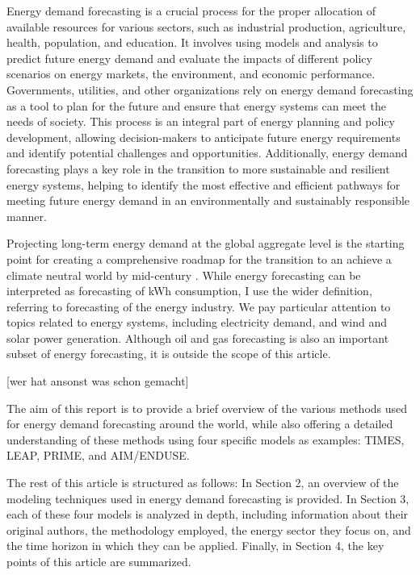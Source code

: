 \documentclass[lettersize,journal]{IEEEtran}
\begin{document}
Energy demand forecasting is a crucial process for the proper allocation of available resources for various sectors, such as industrial production, agriculture, health, population, and education. It involves using models and analysis to predict future energy demand and evaluate the impacts of different policy scenarios on energy markets, the environment, and economic performance. Governments, utilities, and other organizations rely on energy demand forecasting as a tool to plan for the future and ensure that energy systems can meet the needs of society. This process is an integral part of energy planning and policy development, allowing decision-makers to anticipate future energy requirements and identify potential challenges and opportunities. Additionally, energy demand forecasting plays a key role in the transition to more sustainable and resilient energy systems, helping to identify the most effective and efficient pathways for meeting future energy demand in an environmentally and sustainably responsible manner.

Projecting long-term energy demand at the global aggregate level is the starting point for creating a comprehensive roadmap for the transition to an achieve a climate neutral world by mid-century \cite{UNFCCC}. While energy forecasting can be interpreted as forecasting of kWh consumption, I use the wider definition, referring to forecasting of the energy industry. We pay particular attention to topics related to energy systems, including electricity demand, and wind and solar power generation. Although oil and gas forecasting is also an important subset of energy forecasting, it is outside the scope of this article.

[wer hat ansonst was schon gemacht]

The aim of this report is to provide a brief overview of the various methods used for energy demand forecasting around the world, while also offering a detailed understanding of these methods using four specific models as examples: TIMES, LEAP, PRIME, and AIM/ENDUSE.

The rest of this article is structured as follows: In Section 2, an overview of the modeling techniques used in energy demand forecasting is provided. In Section 3, each of these four models is analyzed in depth, including information about their original authors, the methodology employed, the energy sector they focus on, and the time horizon in which they can be applied. Finally, in Section 4, the key points of this article are summarized.
\end{document}

